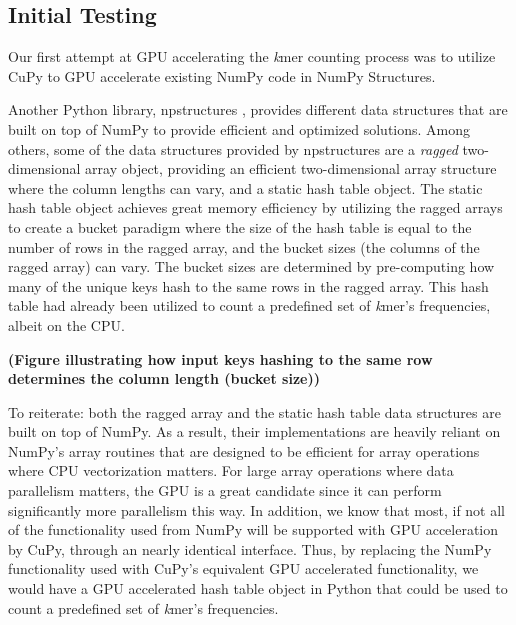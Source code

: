 \subsection{Initial Testing} \label{methods:initial_testing}
Our first attempt at GPU accelerating the \textit{k}mer counting process was to utilize CuPy to GPU accelerate existing NumPy code in NumPy Structures.

Another Python library, npstructures \cite{npstructures}, provides different data structures that are built on top of NumPy to provide efficient and optimized solutions.
Among others, some of the data structures provided by npstructures are a \textit{ragged} two-dimensional array object, providing an efficient two-dimensional array structure where the column lengths can vary, and a static hash table object.
The static hash table object achieves great memory efficiency by utilizing the ragged arrays to create a bucket paradigm where the size of the hash table is equal to the number of rows in the ragged array, and the bucket sizes (the columns of the ragged array) can vary.
The bucket sizes are determined by pre-computing how many of the unique keys hash to the same rows in the ragged array.
This hash table had already been utilized to count a predefined set of \textit{k}mer's frequencies, albeit on the CPU.

\textbf{(Figure illustrating how input keys hashing to the same row determines the column length (bucket size))}

To reiterate: both the ragged array and the static hash table data structures are built on top of NumPy.
As a result, their implementations are heavily reliant on NumPy's array routines that are designed to be efficient for array operations where CPU vectorization matters. 
For large array operations where data parallelism matters, the GPU is a great candidate since it can perform significantly more parallelism this way.
In addition, we know that most, if not all of the functionality used from NumPy will be supported with GPU acceleration by CuPy, through an nearly identical interface.
Thus, by replacing the NumPy functionality used with CuPy's equivalent GPU accelerated functionality, we would have a GPU accelerated hash table object in Python that could be used to count a predefined set of \textit{k}mer's frequencies.

